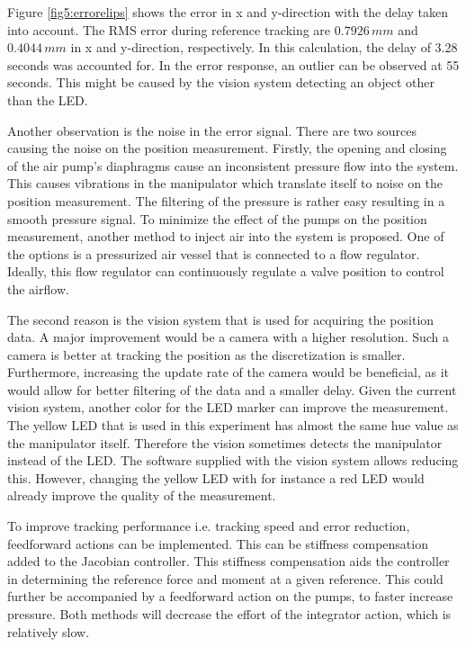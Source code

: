 Figure \ref{fig5:errorelips} shows the error in x and y-direction with the delay taken into account. The RMS error during reference tracking are $0.7926 \hspace{2pt} mm$ and $0.4044  \hspace{2pt} mm$ in x and y-direction, respectively. In this calculation, the delay of 3.28 seconds was accounted for. In the error response, an outlier can be observed at 55 seconds. This might be caused by the vision system detecting an object other than the LED. 

Another observation is the noise in the error signal. There are two sources causing the noise on the position measurement. Firstly, the opening and closing of the air pump's diaphragms cause an inconsistent pressure flow into the system. This causes vibrations in the manipulator which translate itself to noise on the position measurement. The filtering of the pressure is rather easy resulting in a smooth pressure signal. To minimize the effect of the pumps on the position measurement, another method to inject air into the system is proposed. One of the options is a pressurized air vessel that is connected to a flow regulator. Ideally, this flow regulator can continuously regulate a valve position to control the airflow. 

The second reason is the vision system that is used for acquiring the position data. A major improvement would be a camera with a higher resolution. Such a camera is better at tracking the position as the discretization is smaller. Furthermore, increasing the update rate of the camera would be beneficial, as it would allow for better filtering of the data and a smaller delay. Given the current vision system, another color for the LED marker can improve the measurement. The yellow LED that is used in this experiment has almost the same hue value as the manipulator itself. Therefore the vision sometimes detects the manipulator instead of the LED. The software supplied with the vision system allows reducing this. However, changing the yellow LED with for instance a red LED would already improve the quality of the measurement.  

To improve tracking performance i.e. tracking speed and error reduction, feedforward actions can be implemented. This can be stiffness compensation added to the Jacobian controller. This stiffness compensation aids the controller in determining the reference force and moment at a given reference. This could further be accompanied by a feedforward action on the pumps, to faster increase pressure. Both methods will decrease the effort of the integrator action, which is relatively slow. 


